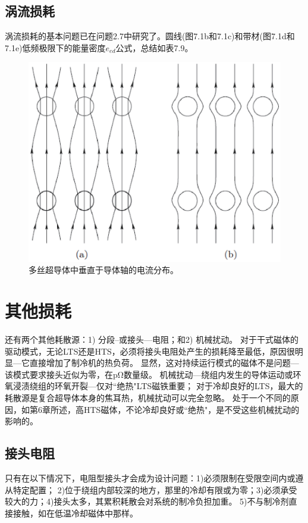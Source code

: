 \subsection{涡流损耗}
涡流损耗的基本问题已在问题2.7中研究了。圆线(图7.1b和7.1c)和带材(图7.1d和7.1e)低频极限下的能量密度$e_{ed}$公式，总结如表7.9。
\begin{figure}[htbp]
	\centering
	\includegraphics[scale=0.6]{chpt7/figs/fig7.6.eps}
	\caption{多丝超导体中垂直于导体轴的电流分布。}
\end{figure}

\section{其他损耗}
还有两个其他耗散源：1) 分段--或接头---电阻；和2) 机械扰动。
对于干式磁体的驱动模式，无论LTS还是HTS，必须将接头电阻处产生的损耗降至最低，原因很明显---它直接增加了制冷机的热负荷。
显然，这对持续运行模式的磁体不是问题---该模式要求接头近似为零，在$\mathrm{p\Omega}$数量级。
机械扰动---绕组内发生的导体运动或环氧浸渍绕组的环氧开裂---仅对``绝热"LTS磁铁重要；
对于冷却良好的LTS，最大的耗散源是复合超导体本身的焦耳热，机械扰动可以完全忽略。
处于一个不同的原因，如第6章所述，高HTS磁体，不论冷却良好或``绝热"，是不受这些机械扰动的影响的。
\subsection{接头电阻}
只有在以下情况下，电阻型接头才会成为设计问题：1)必须限制在受限空间内或遵从特定配置；
2)位于绕组内部较深的地方，那里的冷却有限或为零；3)必须承受较大的力；4)接头太多，其累积耗散会对系统的制冷负担加重。
5)不与制冷剂直接接触，如在低温冷却磁体中那样。

